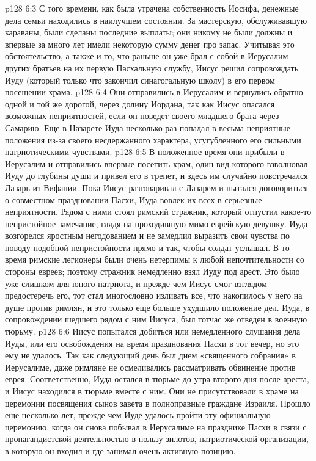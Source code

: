 \vs p128 6:3 \pc С того времени, как была утрачена собственность Иосифа, денежные дела семьи находились в наилучшем состоянии. За мастерскую, обслуживавшую караваны, были сделаны последние выплаты; они никому не были должны и впервые за много лет имели некоторую сумму денег про запас. Учитывая это обстоятельство, а также и то, что раньше он уже брал с собой в Иерусалим других братьев на их первую Пасхальную службу, Иисус решил сопровождать Иуду (который только что закончил синагогальную школу) в его первом посещении храма.
\vs p128 6:4 Они отправились в Иерусалим и вернулись обратно одной и той же дорогой, через долину Иордана, так как Иисус опасался возможных неприятностей, если он поведет своего младшего брата через Самарию. Еще в Назарете Иуда несколько раз попадал в весьма неприятные положения из\hyp{}за своего несдержанного характера, усугубленного его сильными патриотическими чувствами.
\vs p128 6:5 В положенное время они прибыли в Иерусалим и отправились впервые посетить храм, один вид которого взволновал Иуду до глубины души и привел его в трепет, и здесь им случайно повстречался Лазарь из Вифании. Пока Иисус разговаривал с Лазарем и пытался договориться о совместном праздновании Пасхи, Иуда вовлек их всех в серьезные неприятности. Рядом с ними стоял римский стражник, который отпустил какое\hyp{}то непристойное замечание, глядя на проходившую мимо еврейскую девушку. Иуда возгорелся яростным негодованием и не замедлил выразить свои чувства по поводу подобной непристойности прямо и так, чтобы солдат услышал. В то время римские легионеры были очень нетерпимы к любой непочтительности со стороны евреев; поэтому стражник немедленно взял Иуду под арест. Это было уже слишком для юного патриота, и прежде чем Иисус смог взглядом предостеречь его, тот стал многословно изливать все, что накопилось у него на душе против римлян, и это только еще больше ухудшило положение дел. Иуда, в сопровождении шедшего рядом с ним Иисуса, был тотчас же отведен в военную тюрьму.
\vs p128 6:6 Иисус попытался добиться или немедленного слушания дела Иуды, или его освобождения на время празднования Пасхи в тот вечер, но это ему не удалось. Так как следующий день был днем «священного собрания» в Иерусалиме, даже римляне не осмеливались рассматривать обвинение против еврея. Соответственно, Иуда остался в тюрьме до утра второго дня после ареста, и Иисус находился в тюрьме вместе с ним. Они не присутствовали в храме на церемонии посвящения сынов завета в полноправные граждане Израиля. Прошло еще несколько лет, прежде чем Иуде удалось пройти эту официальную церемонию, когда он снова побывал в Иерусалиме на празднике Пасхи в связи с пропагандистской деятельностью в пользу зилотов, патриотической организации, в которую он входил и где занимал очень активную позицию.
